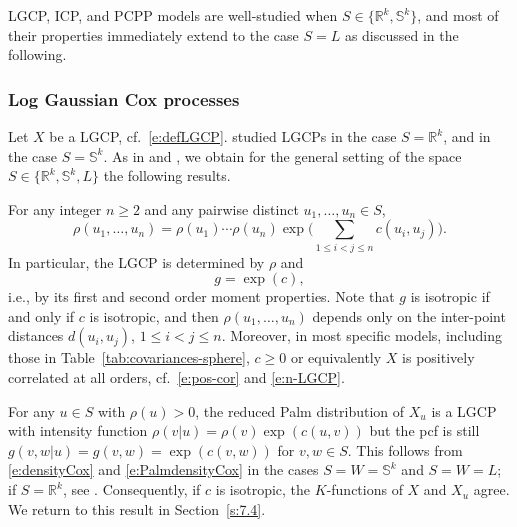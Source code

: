 \documentclass[alpha-refs]{wiley-article}
\begin{document}
LGCP, ICP, and PCPP models are well-studied when $S\in\{\mathbb R^k,\mathbb S^k\}$, and most of their properties immediately extend to the case $S=L$ as discussed in the following. 

\subsubsection{Log Gaussian Cox processes}\label{s:LGCP}

Let $X$ be a LGCP, cf.\ \eqref{e:defLGCP}. \citet{LGCP} studied LGCPs in the case $S=\mathbb R^k$, and \citet{CM} in the case $S=\mathbb S^k$. As in \citet{LGCP} and \citet{CoeurjollyEtAl}, we obtain for  the general setting of the space $S\in\{\mathbb R^k,\mathbb S^k,L\}$ the following results. 

 For any integer $n\ge2$ and any pairwise distinct $u_1,\ldots,u_n\in S$,
\begin{equation}\label{e:n-LGCP}
\rho(u_1,\ldots,u_n)=\rho(u_1)\cdots\rho(u_n)\exp\bigg(\sum_{1\le i<j\le n}c(u_i,u_j)\bigg).
\end{equation}
In particular, the LGCP is determined by $\rho$ and 
\begin{equation}\label{e:pairLGCP}
g=\exp(c),
\end{equation} 
i.e., by its first and second order moment properties. Note that $g$ is isotropic if and only if $c$ is isotropic, and %
then $\rho(u_1,\ldots,u_n)$ depends only on the inter-point distances $d(u_i,u_j)$, $1\le i<j\le n$.  
Moreover, in most specific models, including those in Table~\ref{tab:covariances-sphere}, $c\ge0$ or equivalently $X$ is positively correlated at all orders, cf.\ \eqref{e:pos-cor} and \eqref{e:n-LGCP}. 

For any $u\in S$ with $\rho(u)>0$, the reduced Palm distribution of $X_u$ is a LGCP with intensity function $\rho(v|u)=\rho(v)\exp(c(u,v))$ but the pcf is still $g(v,w|u)=g(v,w)=\exp(c(v,w))$ for $v,w\in S$. This follows from \eqref{e:densityCox} and \eqref{e:PalmdensityCox} in the cases $S=W=\mathbb S^k$ and $S=W=L$; if $S=\mathbb R^k$, see \citet{CoeurjollyEtAl}. Consequently, if $c$ is isotropic, the $K$-functions of $X$ and $X_u$ agree. We return to this result in Section~\ref{s:7.4}. 
\end{document}
